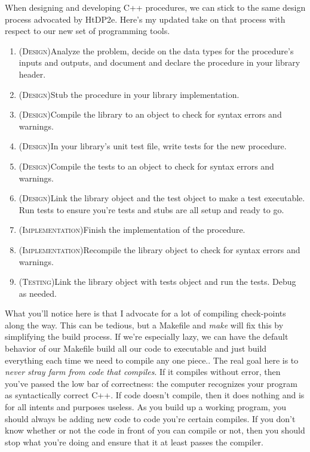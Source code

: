 \documentclass[]{tufte-handout}
\begin{document}
When designing and developing C++ procedures, we can stick to the same design process advocated by HtDP2e. Here's my updated take on that process with respect to our new set of programming tools.
\begin{enumerate}
\item (\textsc{Design})Analyze the problem, decide on the data types for the procedure's inputs and outputs, and document and declare the procedure in your library header.
\item (\textsc{Design})Stub the procedure in your library implementation. 
\item (\textsc{Design})Compile the library to an object to check for syntax errors and warnings. 
\item (\textsc{Design})In your library's unit test file, write tests for the new procedure.
\item (\textsc{Design})Compile the tests to an object to check for syntax errors and warnings.  
\item (\textsc{Design})Link the library object and the test object to make a test executable. Run tests to ensure you're tests and stubs are all setup and ready to go.
\item (\textsc{Implementation})Finish the implementation of the procedure. 
\item (\textsc{Implementation})Recompile the library object to check for syntax errors and warnings.
\item (\textsc{Testing})Link the library object with tests object and run the tests. Debug as needed.
\end{enumerate}
What you'll notice here is that I advocate for a lot of compiling check-points along the way. This can be tedious, but a Makefile and \textit{make} will fix this by simplifying the build process. If we're especially lazy, we can have the default behavior of our Makefile build all our code to executable and just build everything each time we need to compile any one piece.. The real goal here is to \textit{never stray farm from code that compiles}. If it compiles without error, then you've passed the low bar of correctness: the computer recognizes your program as syntactically correct C++. If code doesn't compile, then it does nothing and is for all intents and purposes useless.  As you build up a working program, you should always be adding new code to code you're certain compiles. If you don't know whether or not the code in front of you can compile or not, then you should stop what you're doing and ensure that it at least passes the compiler.
\end{document}
